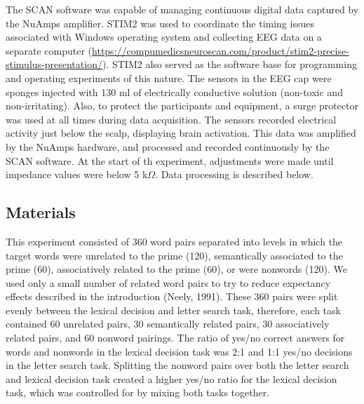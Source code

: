 \documentclass[english,man]{apa6}
\theoremstyle{definition}
\theoremstyle{definition}
\theoremstyle{definition}
\theoremstyle{remark}
\begin{document}
The SCAN software was capable of managing continuous digital data
captured by the NuAmps amplifier. STIM2 was used to coordinate the
timing issues associated with Windows operating system and collecting
EEG data on a separate computer
(\url{https://compumedicsneuroscan.com/product/stim2-precise-stimulus-presentation/}).
STIM2 also served as the software base for programming and operating
experiments of this nature. The sensors in the EEG cap were sponges
injected with 130 ml of electrically conductive solution (non-toxic and
non-irritating). Also, to protect the participants and equipment, a
surge protector was used at all times during data acquisition. The
sensors recorded electrical activity just below the scalp, displaying
brain activation. This data was amplified by the NuAmps hardware, and
processed and recorded continuously by the SCAN software. At the start
of th experiment, adjustments were made until impedance values were
below 5 k\(\Omega\). Data processing is described below.

\subsection{Materials}\label{materials}

This experiment consisted of 360 word pairs separated into levels in
which the target words were unrelated to the prime (120), semantically
associated to the prime (60), associatively related to the prime (60),
or were nonwords (120). We used only a small number of related word
pairs to try to reduce expectancy effects described in the introduction
(Neely, 1991). These 360 pairs were split evenly between the lexical
decision and letter search task, therefore, each task contained 60
unrelated pairs, 30 semantically related pairs, 30 associatively related
pairs, and 60 nonword pairings. The ratio of yes/no correct answers for
words and nonwords in the lexical decision task was 2:1 and 1:1 yes/no
decisions in the letter search task. Splitting the nonword pairs over
both the letter search and lexical decision task created a higher yes/no
ratio for the lexical decision task, which was controlled for by mixing
both tasks together.
\end{document}
